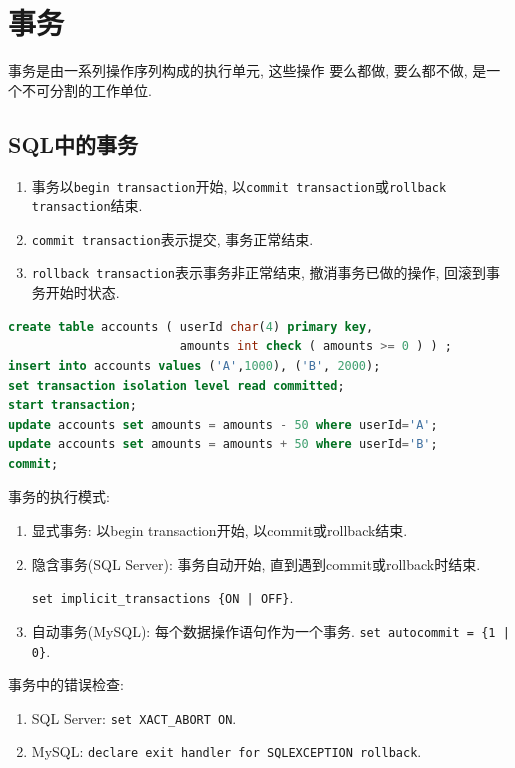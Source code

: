 \chapter{事务}

\begin{definition}[事务]
  事务是由一系列操作序列构成的执行单元, 这些操作
要么都做, 要么都不做, 是一个不可分割的工作单位.
\end{definition}

\section{SQL中的事务}

\begin{enumerate}
    \item 事务以\verb|begin transaction|开始, 以\verb|commit transaction|或\verb|rollback transaction|结束.
    \item \verb|commit transaction|表示提交, 事务正常结束.
    \item \verb|rollback transaction|表示事务非正常结束, 撤消事务已做的操作, 回滚到事务开始时状态.
\end{enumerate}

\begin{lstlisting}[language=SQL]
create table accounts ( userId char(4) primary key,
                        amounts int check ( amounts >= 0 ) ) ;
insert into accounts values ('A',1000), ('B', 2000);
set transaction isolation level read committed;
start transaction;
update accounts set amounts = amounts - 50 where userId='A';
update accounts set amounts = amounts + 50 where userId='B';
commit;
\end{lstlisting}

事务的执行模式:
\begin{enumerate}
    \item 显式事务: 以begin transaction开始, 以commit或rollback结束.
    \item 隐含事务(SQL Server): 事务自动开始, 直到遇到commit或rollback时结束.
    
    \verb+set implicit_transactions {ON | OFF}+.
    \item 自动事务(MySQL): 每个数据操作语句作为一个事务. \verb+set autocommit = {1 | 0}+.
\end{enumerate}

事务中的错误检查:
\begin{enumerate}
    \item SQL Server: \verb|set XACT_ABORT ON|.
    \item MySQL: \verb|declare exit handler for SQLEXCEPTION rollback|.
\end{enumerate}


